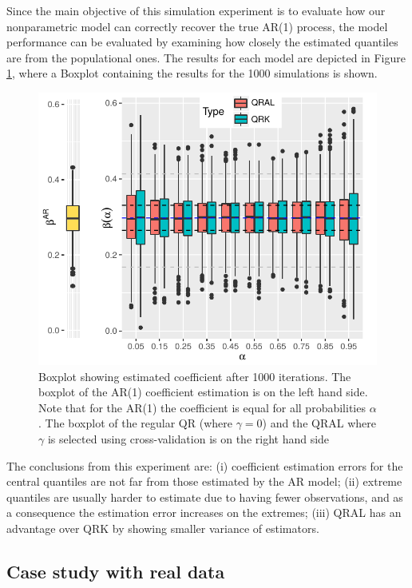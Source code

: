 Since the main objective of this simulation experiment is to evaluate how our nonparametric model can correctly recover the true AR(1) process, the model performance can be evaluated by examining how closely the estimated quantiles are from the populational ones. The results for each model are depicted in Figure \ref{fig:boxplot-ar1}, where a Boxplot containing the results for the 1000 simulations is shown. %
\begin{figure}[ht]
	\centering
	\includegraphics[width=1.0\linewidth]{Images/boxplot-ar1.pdf}
	\caption{Boxplot showing estimated coefficient after 1000 iterations. The boxplot of the AR(1) coefficient estimation is on the left hand side. Note that for the AR(1) the coefficient is equal for all probabilities $\alpha$. The boxplot of the regular QR (where $\gamma = 0$) and the QRAL where $\gamma$ is selected using cross-validation is on the right hand side }
	\label{fig:boxplot-ar1}
\end{figure}
The conclusions from this experiment are: (i) coefficient estimation errors for the central quantiles are not far from those estimated by the AR model; (ii) extreme quantiles are usually harder to estimate due to having fewer observations, and as a consequence the estimation error increases on the extremes; (iii) QRAL has an advantage over QRK by showing smaller variance of estimators.


\subsection{Case study with real data}


